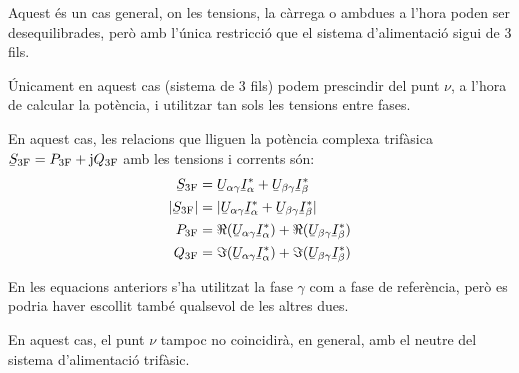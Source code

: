 Aquest \'{e}s un cas  general, on les tensions, la c\`{a}rrega o ambdues a
l'hora  poden ser desequilibrades, per\`{o} amb l'\'{u}nica restricci\'{o} que
el sistema d'alimentaci\'{o} sigui de 3 fils.

 \'{U}nicament en aquest cas (sistema de 3 fils) podem prescindir del punt $\nu$, a l'hora de
calcular la pot\`{e}ncia, i utilitzar tan sols les tensions entre fases.

En aquest cas, les relacions que lliguen la pot\`{e}ncia complexa
trif\`{a}sica $\cmplx{S}\ped{3F} = P\ped{3F} + \ju Q\ped{3F}$ amb les
tensions i corrents s\'{o}n:
\begin{align}
    \cmplx{S}\ped{3F} &= \cmplx{U}_{\alpha\gamma} \cmplx{I}_\alpha^*
     +  \cmplx{U}_{\beta\gamma} \cmplx{I}_\beta^*  \label{eq:s_3f_3fils}\\
    |\cmplx{S}\ped{3F}| &= |\cmplx{U}_{\alpha\gamma} \cmplx{I}_\alpha^* +
    \cmplx{U}_{\beta\gamma} \cmplx{I}_\beta^*| \\
    P\ped{3F} &= \Re(\cmplx{U}_{\alpha\gamma} \cmplx{I}_\alpha^*) +
    \Re(\cmplx{U}_{\beta\gamma} \cmplx{I}_\beta^*) \\
    Q\ped{3F} &= \Im(\cmplx{U}_{\alpha\gamma} \cmplx{I}_\alpha^*) +
    \Im(\cmplx{U}_{\beta\gamma} \cmplx{I}_\beta^*)
\end{align}

En les equacions anteriors s'ha utilitzat la fase $\gamma$ com a
fase de refer\`{e}ncia, per\`{o} es podria haver escollit tamb\'{e} qualsevol de
les altres dues.

En aquest cas, el punt $\nu$ tampoc no coincidir\`{a}, en general, amb
el neutre del sistema d'alimentaci\'{o} trif\`{a}sic.

